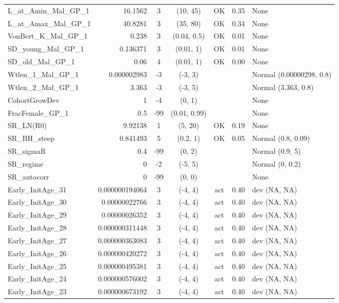 \documentclass[12pt,]{article}
\begin{document}
\begin{landscape}
\begin{longtable}{lrcccll}
  L\_at\_Amin\_Mal\_GP\_1 & 16.1562 & 3 & (10, 45) & OK & 0.35 & None \\ 
  L\_at\_Amax\_Mal\_GP\_1 & 40.8281 & 3 & (35, 80) & OK & 0.34 & None \\ 
  VonBert\_K\_Mal\_GP\_1 & 0.238 & 3 & (0.04, 0.5) & OK & 0.01 & None \\ 
  SD\_young\_Mal\_GP\_1 & 0.136371 & 3 & (0.01, 1) & OK & 0.01 & None \\ 
  SD\_old\_Mal\_GP\_1 & 0.06 & 4 & (0.01, 1) & OK & 0.00 & None \\ 
  Wtlen\_1\_Mal\_GP\_1 & 0.000002983 & -3 & (-3, 3) &  &  & Normal (0.00000298, 0.8) \\ 
  Wtlen\_2\_Mal\_GP\_1 & 3.363 & -3 & (-3, 5) &  &  & Normal (3.363, 0.8) \\ 
  CohortGrowDev & 1 & -4 & (0, 1) &  &  & None \\ 
  FracFemale\_GP\_1 & 0.5 & -99 & (0.01, 0.99) &  &  & None \\ 
  SR\_LN(R0) & 9.92138 & 1 & (5, 20) & OK & 0.19 & None \\ 
  SR\_BH\_steep & 0.841493 & 5 & (0.2, 1) & OK & 0.05 & Normal (0.8, 0.09) \\ 
  SR\_sigmaR & 0.4 & -99 & (0, 2) &  &  & Normal (0.9, 5) \\ 
  SR\_regime & 0 & -2 & (-5, 5) &  &  & Normal (0, 0.2) \\ 
  SR\_autocorr & 0 & -99 & (0, 0) &  &  & None \\ 
  Early\_InitAge\_31 & 0.000000194064 & 3 & (-4, 4) & act & 0.40 & dev (NA, NA) \\ 
  Early\_InitAge\_30 & 0.00000022766 & 3 & (-4, 4) & act & 0.40 & dev (NA, NA) \\ 
  Early\_InitAge\_29 & 0.00000026352 & 3 & (-4, 4) & act & 0.40 & dev (NA, NA) \\ 
  Early\_InitAge\_28 & 0.000000311448 & 3 & (-4, 4) & act & 0.40 & dev (NA, NA) \\ 
  Early\_InitAge\_27 & 0.000000363083 & 3 & (-4, 4) & act & 0.40 & dev (NA, NA) \\ 
  Early\_InitAge\_26 & 0.000000420272 & 3 & (-4, 4) & act & 0.40 & dev (NA, NA) \\ 
  Early\_InitAge\_25 & 0.000000495381 & 3 & (-4, 4) & act & 0.40 & dev (NA, NA) \\ 
  Early\_InitAge\_24 & 0.000000576002 & 3 & (-4, 4) & act & 0.40 & dev (NA, NA) \\ 
  Early\_InitAge\_23 & 0.000000673192 & 3 & (-4, 4) & act & 0.40 & dev (NA, NA) \\ 

\end{longtable}
\end{landscape}
\end{document}
